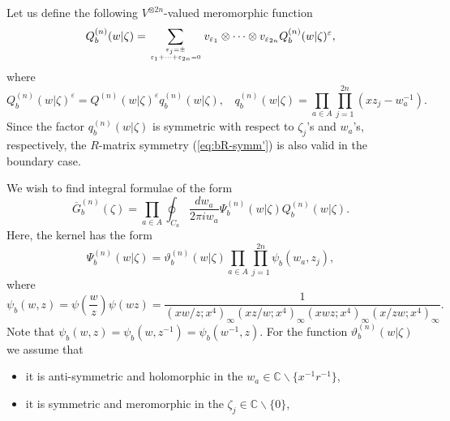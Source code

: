 \documentclass[a4paper,10pt]{article}
\begin{document}
{Let us define the 
following $V^{\otimes 2n}$-valued meromorphic function 
\begin{equation}
Q_b^{(n)}(w|\zeta )=\sum_{\varepsilon_j =\pm\atop 
\varepsilon_1 +\cdots +\varepsilon_{2n}=0} 
v_{\varepsilon_1}\otimes \cdots \otimes 
v_{\varepsilon_{2n}} 
Q_b^{(n)}(w|\zeta )^{\varepsilon}, 
\label{eq:vec-Qb}
\end{equation}
where 
\begin{equation}
Q_b^{(n)}(w|\zeta )^{\varepsilon} 
=Q^{(n)}(w|\zeta )^{\varepsilon} q_b^{(n)}(w|\zeta ), 
~~~~
q_b^{(n)}(w|\zeta )=
\prod_{a\in A} \prod_{j=1}^{2n} (xz_j -w_a^{-1}). 
\label{eq:df-Qb}
\end{equation}
Since the factor $q_b^{(n)}(w|\zeta )$ is symmetric 
with respect to $\zeta_j$'s and $w_a$'s, respectively, 
the $R$-matrix symmetry (\ref{eq:bR-symm'}) is also valid 
in the boundary case. 

We wish to find integral formulae of the form 
\begin{equation}
\overline{G}_{b}^{(n)} (\zeta)=
\prod_{a\in A}\oint_{C_a} 
\dfrac{dw_a}{2\pi iw_a} 
\Psi_{b}^{(n)} (w|\zeta )
Q_b^{(n)}(w|\zeta). 
\label{eq:Gb-form}
\end{equation}
Here, the kernel has the form 
\begin{equation}
\Psi^{(n)}_b (w| \zeta )=
\vartheta^{(n)}_b (w | \zeta )
\prod_{a\in A}\prod_{j=1}^{2n} 
\psi_b (w_{a},z_j ),
\label{eq:df-Psib}
\end{equation}
where
\begin{equation}
\psi_b (w, z)=\psi \left( \frac{w}{z} \right) 
\psi \left( wz \right) =\frac{1}{(xw/z;x^4)_{\infty}
(xz/w;x^4)_{\infty}(xwz;x^4)_{\infty}
(x/zw;x^4)_{\infty}}. 
\label{eq:df-psib}
\end{equation}
Note that $\psi_b (w, z)=\psi_b (w, z^{-1})=
\psi_b (w^{-1}, z)$. 
For the function 
$\vartheta^{(n)}_b (w|\zeta )$ 
we assume that
\begin{itemize}
\item
it is anti-symmetric and holomorphic
in the $w_a \in \mathbb{C} \backslash \{x^{-1}r^{-1}\}$,
 
\item
it is symmetric and meromorphic
in the $\zeta_j\in \mathbb{C} \backslash \{0\}$,
 

\end{itemize}}
\end{document}
